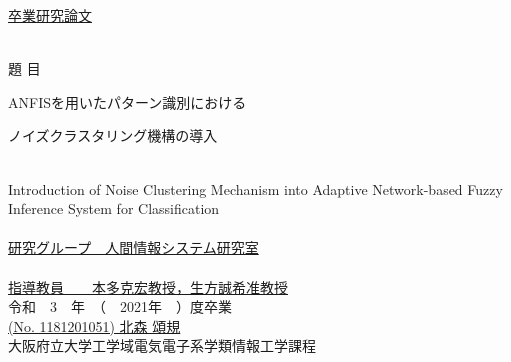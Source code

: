 \documentclass[fleqn]{ujarticle}
\begin{document}
\thispagestyle{empty}
\begin{titlepage}
\begin{center}
\vspace*{20mm}
{\Huge \underline{卒業研究論文}}\\
\vspace*{20mm}

\underline{\hspace{160mm}}\\
\Large{題 \hspace{10mm} 目}\\
\vspace*{5mm}
{\huge ANFISを用いたパターン識別における

ノイズクラスタリング機構の導入}\\
\vspace{4mm}
{\LARGE Introduction of Noise Clustering Mechanism into Adaptive Network-based Fuzzy Inference System for Classification}\\ %
\underline{\hspace{160mm}}\\

\vspace*{25mm}
{\Large \underline{研究グループ\hspace{8mm}　人間情報システム研究室}}\\
{\Large \ } \\
{\Large \underline{指導教員　　\hspace{4mm}本多克宏教授，生方誠希准教授}}\\
\vspace*{25mm}
{\Large 令和　3　年　（　2021年　）度卒業}\\
\vspace*{5mm}
{\Large  \underline{(No. 1181201051) \hspace{15mm} 北森 頌規\hspace{15mm} } }\\
\vspace{15mm}
{\Large 大阪府立大学工学域電気電子系学類情報工学課程}\\

\end{center}
\end{titlepage}
%
%
\clearpage
\pagestyle{myheadings}
\twocolumn
\end{document}

